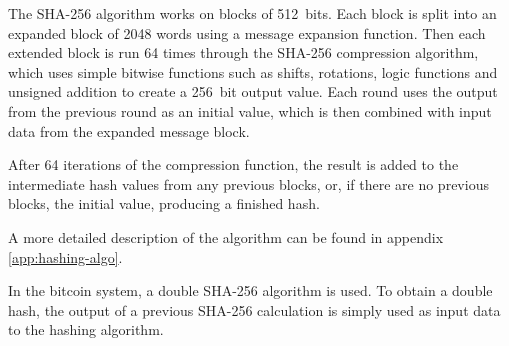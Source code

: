 The SHA-256 algorithm works on blocks of 512~bits. Each block is split into an expanded
block of 2048 words using a message expansion function. Then each extended block is run
64 times through the SHA-256 compression algorithm, which uses simple bitwise functions
such as shifts, rotations, logic functions and unsigned addition to create a 256~bit
output value. Each round uses the output from the previous round as an initial value,
which is then combined with input data from the expanded message block.

After 64 iterations of the compression function, the result is added to the intermediate
hash values from any previous blocks, or, if there are no previous blocks, the initial
value, producing a finished hash.

A more detailed description of the algorithm can be found in appendix \ref{app:hashing-algo}.

In the bitcoin system, a double SHA-256 algorithm is used. To obtain a double hash, the
output of a previous SHA-256 calculation is simply used as input data to the hashing
algorithm.



%
%
%       
%
%


